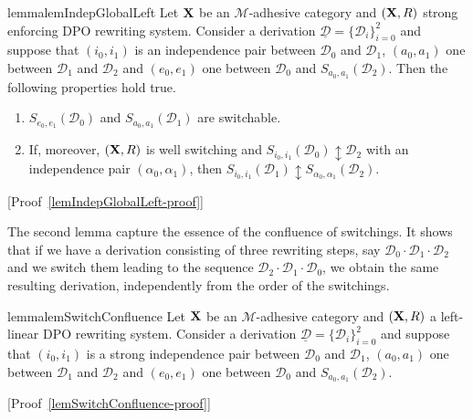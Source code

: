 \documentclass[a4paper,UKenglish,cleveref,pdftex,thm-restate,numberwithinsect,anonymous]{lipics}
\def\R{\mathsf{R}}
\def\X{\textbf {\textup{X}}}
\newcommand{\dder}[1]{\mathscr{#1}}
\newcommand{\der}[1]{\underline{\dder{#1}}}
\newcommand{\seqind}{\ensuremath{\updownarrow}}
\begin{document}
\begin{restatable}{lemma}{lemIndepGlobalLeft}
  \label{lem:indep-global-left}
  Let $\X$ be an $\mathcal{M}$-adhesive category and
  $(\X,\R)$ strong enforcing DPO rewriting system.
  Consider a derivation
  $\der{D}=\{\dder{D}_i\}_{i=0}^2$ and suppose that $(i_0,i_1)$ is an independence pair between $\dder{D}_0$ and $\dder{D}_1$,
  $(a_0,a_1)$ one between $\dder{D}_1$ and $\dder{D}_2$ and
  $(e_0, e_1)$ one between $\dder{D}_0$ and
  $S_{a_0,a_1}(\dder{D}_2)$. Then the following properties hold true.
  \begin{enumerate}
  \item
    \label{lem:indep-global-left:1}
    $S_{e_0,e_1}(\dder{D}_0)$ and $S_{a_0,a_1}(\dder{D}_1)$ are
    switchable.
    
  \item
    \label{lem:indep-global-left:2}
    If, moreover, $(\X, \R)$ is well switching and $S_{i_0, i_1}(\dder{D}_0)\seqind \dder{D}_2$ with an independence pair $(\alpha_0, \alpha_1)$, then
    $S_{i_0,i_1}(\dder{D}_1)\seqind S_{\alpha_0, \alpha_1}(\dder{D}_2)$.
  \end{enumerate}
\end{restatable}


[Proof~\ref{lemIndepGlobalLeft-proof}]


The second lemma capture the essence of the confluence of
switchings. It shows that if we have a derivation consisting of three
rewriting steps, say $\dder{D}_0\cdot \dder{D}_1\cdot  \dder{D}_2$ and we switch them leading to the
sequence $\dder{D}_2\cdot  \dder{D}_1\cdot  \dder{D}_0$, we obtain the same resulting derivation,
independently from the order of the switchings.


\begin{restatable}{lemma}{lemSwitchConfluence}
	\label{lem:switch-confluence}
	Let $\X$ be an $\mathcal{M}$-adhesive category and $(\X,\R)$ a
	left-linear DPO rewriting system.
	Consider a derivation $\der{D}=\{\dder{D}_i\}_{i=0}^2$ and suppose
	that $(i_0,i_1)$ is a strong independence pair between $\dder{D}_0$
	and $\dder{D}_1$, $(a_0,a_1)$ one between $\dder{D}_1$ and
	$\dder{D}_2$ and $(e_0, e_1)$ one between $\dder{D}_0$ and
	$S_{a_0,a_1}(\dder{D}_2)$.
\end{restatable}

[Proof~\ref{lemSwitchConfluence-proof}]
\end{document}
